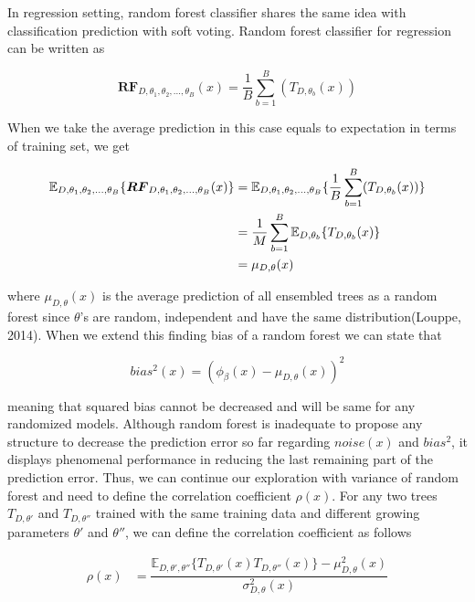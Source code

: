 In regression setting, random forest classifier shares the same idea with classification prediction with soft voting. 
Random forest classifier for regression can be written as

\begin{equation}
\boldsymbol{RF}_{D, \theta_{1},\theta_{2},..., \theta_{B}}(x) = \dfrac{1}{B}\sum_{b = 1}^{B}(T_{D,\theta_{b}}(x))
\end{equation}

When we take the average prediction in this case equals to expectation in terms of training set, we get

\begin{align}\label{eq:mu}
\mathbb{E}_{D, \theta_{1}, \theta_{2},..., \theta_{B}}\{\boldsymbol{RF}_{D, \theta_{1},\theta_{2},..., \theta_{B}}(x) \} & = 
	\mathbb{E}_{D, \theta_{1}, \theta_{2},..., \theta_{B}}\{\dfrac{1}{B}\sum_{b = 1}^{B}(T_{D,\theta_{b}}(x))\} \notag \\
	& = \dfrac{1}{M}\sum_{b=1}^{B}\mathbb{E}_{D,\theta_{b}}\{T_{D, \theta_{b}}(x)\}\notag \\
	& = \mu_{D,\theta}(x)
\end{align}

where $\mu_{D,\theta}(x)$ is the average prediction of all ensembled trees as a random forest since $\theta$'s are random, 
independent and have the same distribution(Louppe, 2014). When we extend this finding bias of a random forest 
we can state that 

\begin{equation}
bias^2(x) = (\phi_{\beta}(x) - \mu_{D,\theta}(x))^2
\end{equation}

meaning that squared bias cannot be decreased and will be same for any randomized models. 
Although random forest is inadequate to propose any structure to decrease the prediction error so far regarding $noise(x)$ 
and $bias^2$, it displays phenomenal performance in reducing the last remaining part of the prediction error. 
Thus, we can continue our exploration with variance of random forest and need to define the correlation coefficient $\rho(x)$. 
For any two trees $T_{D,\theta'}$ and $T_{D,\theta''}$ trained with the same training data 
and different growing parameters $\theta'$ and $\theta''$, we can define the correlation coefficient as follows

\begin{align}
\rho(x) & = \dfrac{\mathbb{E}_{D,\theta',\theta''}\{T_{D,\theta'}(x) T_{D,\theta''}(x)\} - \mu_{D,\theta}^2(x)}{\sigma_{D,\theta}^2(x)}
\end{align}


